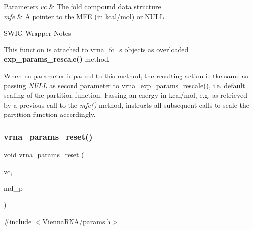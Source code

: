 \begin{DoxyParams}{Parameters}
{\em vc} & The fold compound data structure \\
\hline
{\em mfe} & A pointer to the M\+FE (in kcal/mol) or N\+U\+LL\\
\hline
\end{DoxyParams}
\begin{DoxyRefDesc}{S\+W\+I\+G Wrapper Notes}
\item[\hyperlink{wrappers__wrappers000080}{S\+W\+I\+G Wrapper Notes}]This function is attached to \hyperlink{group__fold__compound_structvrna__fc__s}{vrna\+\_\+fc\+\_\+s} objects as overloaded {\bfseries exp\+\_\+params\+\_\+rescale()} method.

When no parameter is passed to this method, the resulting action is the same as passing {\itshape N\+U\+LL} as second parameter to \hyperlink{group__energy__parameters_gad607bc3a5b5da16400e2ca4ea5560233}{vrna\+\_\+exp\+\_\+params\+\_\+rescale()}, i.\+e. default scaling of the partition function. Passing an energy in kcal/mol, e.\+g. as retrieved by a previous call to the {\itshape mfe()} method, instructs all subsequent calls to scale the partition function accordingly. \end{DoxyRefDesc}
\mbox{\label{group__energy__parameters_gac40dc82e48a72a97cfc58b9da08a7792}} 
\subsubsection{\texorpdfstring{vrna\+\_\+params\+\_\+reset()}{vrna\_params\_reset()}}
{\footnotesize\ttfamily void vrna\+\_\+params\+\_\+reset (\begin{DoxyParamCaption}\item[{\hyperlink{group__fold__compound_ga1b0cef17fd40466cef5968eaeeff6166}{vrna\+\_\+fold\+\_\+compound\+\_\+t} $\ast$}]{vc,  }\item[{\hyperlink{group__model__details_ga1f8a10e12a0a1915f2a4eff0b28ea17c}{vrna\+\_\+md\+\_\+t} $\ast$}]{md\+\_\+p }\end{DoxyParamCaption})}



{\ttfamily \#include $<$\hyperlink{params_8h}{Vienna\+R\+N\+A/params.\+h}$>$}



